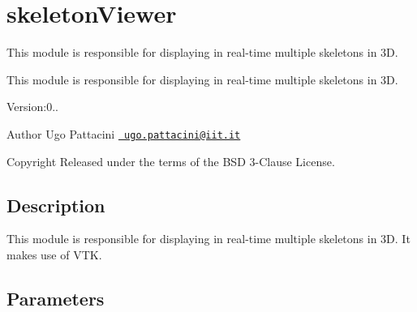 \section{skeleton\+Viewer}
\label{group__skeletonViewer}


This module is responsible for displaying in real-\/time multiple skeletons in 3D.  


This module is responsible for displaying in real-\/time multiple skeletons in 3D. 

Version\+:0.. \begin{DoxyAuthor}{Author}
Ugo Pattacini \href{mailto:ugo.pattacini@iit.it}{\texttt{ ugo.\+pattacini@iit.\+it}} ~\newline
 
\end{DoxyAuthor}
\begin{DoxyCopyright}{Copyright}
Released under the terms of the B\+SD 3-\/Clause License. 
\end{DoxyCopyright}
\hypertarget{group__skeletonViewer_intro_sec}{}\subsection{Description}\label{group__skeletonViewer_intro_sec}
This module is responsible for displaying in real-\/time multiple skeletons in 3D. It makes use of V\+TK.\hypertarget{group__skeletonViewer_parameters_sec}{}\subsection{Parameters}\label{group__skeletonViewer_parameters_sec}

